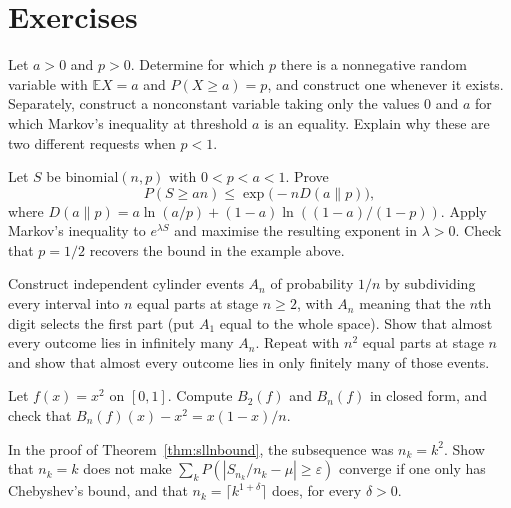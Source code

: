 \section{Exercises}

\begin{exercise}[$\star$]\label{ex:markovsharp}
Let $a>0$ and $p>0$. Determine for which $p$ there is a nonnegative random variable with $\mathbb E X=a$ and $P(X\ge a)=p$, and construct one whenever it exists. Separately, construct a nonconstant variable taking only the values $0$ and $a$ for which Markov's inequality at threshold $a$ is an equality. Explain why these are two different requests when $p<1$.
\end{exercise}

\begin{exercise}[$\star\star$]\label{ex:chernoffbin}
Let $S$ be binomial$(n,p)$ with $0<p<a<1$. Prove
\[
 P(S\ge an)\le\exp\bigl(-n D(a\|p)\bigr),
\]
where $D(a\|p)=a\ln(a/p)+(1-a)\ln((1-a)/(1-p))$. Apply Markov's inequality to $e^{\lambda S}$ and maximise the resulting exponent in $\lambda>0$. Check that $p=1/2$ recovers the bound in the example above.
\end{exercise}

\begin{exercise}[$\star$]\label{ex:bcfinite}
Construct independent cylinder events $A_n$ of probability $1/n$ by subdividing every interval into $n$ equal parts at stage $n\ge2$, with $A_n$ meaning that the $n$th digit selects the first part (put $A_1$ equal to the whole space). Show that almost every outcome lies in infinitely many $A_n$. Repeat with $n^2$ equal parts at stage $n$ and show that almost every outcome lies in only finitely many of those events.
\end{exercise}

\begin{exercise}[$\star\star$]\label{ex:bernstein2}
Let $f(x)=x^2$ on $[0,1]$. Compute $B_2(f)$ and $B_n(f)$ in closed form, and check that $B_n(f)(x)-x^2=x(1-x)/n$.
\end{exercise}

\begin{exercise}[$\star\star$]\label{ex:gapfill}
In the proof of Theorem~\ref{thm:sllnbound}, the subsequence was $n_k=k^2$. Show that $n_k=k$ does not make $\sum_k P(|S_{n_k}/n_k-\mu|\ge\varepsilon)$ converge if one only has Chebyshev's bound, and that $n_k=\lceil k^{1+\delta}\rceil$ does, for every $\delta>0$.
\end{exercise}

